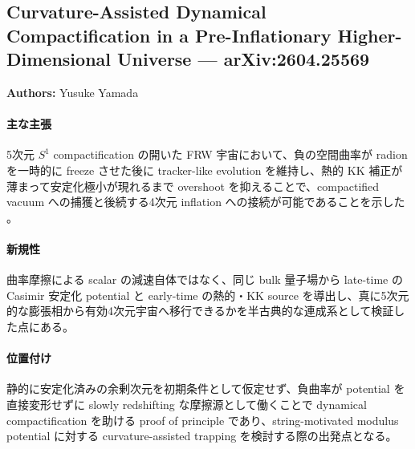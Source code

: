 \subsection{Curvature-Assisted Dynamical Compactification in a Pre-Inflationary Higher-Dimensional Universe --- arXiv:2604.25569}

\textbf{Authors:} Yusuke Yamada

\paragraph{主な主張}
5次元 $S^{1}$ compactification の開いた FRW 宇宙において、負の空間曲率が radion を一時的に freeze させた後に tracker-like evolution を維持し、熱的 KK 補正が薄まって安定化極小が現れるまで overshoot を抑えることで、compactified vacuum への捕獲と後続する4次元 inflation への接続が可能であることを示した \cite{Yamada:2026curvature}。

\paragraph{新規性}
曲率摩擦による scalar の減速自体ではなく、同じ bulk 量子場から late-time の Casimir 安定化 potential と early-time の熱的・KK source を導出し、真に5次元的な膨張相から有効4次元宇宙へ移行できるかを半古典的な連成系として検証した点にある。

\paragraph{位置付け}
静的に安定化済みの余剰次元を初期条件として仮定せず、負曲率が potential を直接変形せずに slowly redshifting な摩擦源として働くことで dynamical compactification を助ける proof of principle であり、string-motivated modulus potential に対する curvature-assisted trapping を検討する際の出発点となる。
